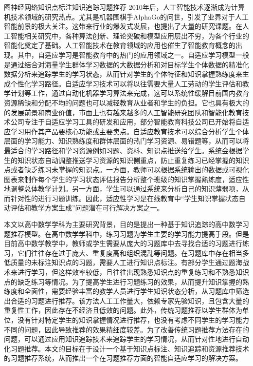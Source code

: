 
\begin{abstractC}{图神经网络}{知识点标注}{知识追踪}{习题推荐}{}
    2010年后，人工智能技术逐渐成为计算机技术领域的研究热点。尤其是机器围棋手AlphaGo的问世，引发了业界对于人工智能前景的极大关注。这带来行业的爆发式发展，也提出了大量的研究课题。在人工智能相关研究中，各种算法创新、理论突破和模型应用层出不穷，为各个行业的智能化奠定了基础。人工智能技术在教育领域的应用也催生了智能教育概念的出现。其中，自适应学习是智能教育中的热门的应用领域之一\cite{chen2018recommendation}。自适应学习模型一般是通过结合对海量学生群体学习数据的大数据分析和对目标学生个体数据的精准化数据分析来追踪学生的学习状态，从而针对学生的个体特征和知识掌握熟练度来生成个性化学习路径\cite{soltani2019adaptive}。自适应学习技术可以将以往需要大量人工劳动的学生评估和教学计划等工作，通过自动化机器学习算法来完成，这可以系统性缓解目前国内教育资源稀缺和分配不均的问题也可以减轻教育从业者和学生的负担。它也具有极大的的发展前景和商业价值，市面上也有越来越多的人工智能研究团队和智能化教育技术公司专注于自适应学习工具的研发和应用，部分智能教育科技公司已开始将自适应学习用作其产品要核心功能或主要卖点。自适应教育技术可以综合分析学生个体层面的学习能力、知识熟练度和群体层面的热门学习资源、易错题等，从而可以将最适合的学习路径和学习资源例如习题、资料、知识点推送给学生。系统会根据学生的知识状态自动调整推送学习资源的知识侧重点，防止重复练习已经掌握的知识点或者缺乏练习未掌握的知识点。一方面，教师可以根据系统输出的数据或可视化图表来制作每个学生的学习状态评估报告分析整个班级的知识掌握熟练度，适应性地调整总体教学计划。另一方面，学生可以通过系统来分析自己的知识薄弱项，从而针对性的进行习题训练。因此，适应性学习是在线教育中``学生知识掌握状态自动评估和教学方案生成''问题潜在可行解决方案之一。

    本文以高中数学学科为主要研究背景，目的是提出一种基于知识追踪的高中数学习题推荐模型。在高中数学学科中，练习习题为学生主要的学习能力提高手段。但是目前高中数学教学中，教师或学生需要从庞大的习题库中去寻找合适的习题进行练习，它们往往存在过于庞大、重复度高和组织混乱等问题。在习题库中存在相当多低质量的未标注知识点的习题，需要人工进行知识点标注。有部分学生通过题海战术来进行学习，但这样效率较低，且往往出现熟悉知识点的重复练习和不熟悉知识点的缺乏练习等情况。为了提高学生进行习题练习的效果，从而提升知识掌握的熟练度和全面性，需要经验丰富的教学人员进行学生知识状态分析，从习题库中筛选出合适的习题进行推荐。该方法人工工作量大，依赖专家先验知识，且包含大量的重复性工作，因此存在不经济且低效的问题。此外，传统习题推荐以学生群体为单位，没有针对特定学生的知识掌握情况进行推荐，也没有考虑不同学生的学习能力不同的问题，因此导致推荐的效果精细度较差。为了改善传统习题推荐方法存在的问题，可以通过应用知识追踪技术来追踪学生的学习情况，从而针对性地进行自动化习题推荐。本文的目标在于设计一个基于知识点标注、知识追踪和资源推荐技术的习题推荐系统，从而推出一个在习题推荐方面的智能自适应学习的解决方案。


\end{abstractC}
